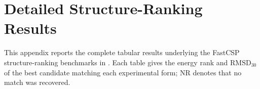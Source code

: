 \section{Detailed Structure-Ranking Results}
\label{app:structure-ranking-results}

This appendix reports the complete tabular results underlying the FastCSP structure-ranking benchmarks in . Each table gives the energy rank and $\mathrm{RMSD}_{30}$ of the best candidate matching each experimental form; NR denotes that no match was recovered.



\clearpage

